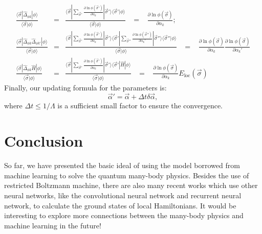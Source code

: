 \documentclass[letterpaper, 10pt]{article}
\newcommand{\qbar}{\rangle}
\newcommand{\qket}{\langle}
\begin{document}
\begin{eqnarray*}
\frac{\qket \vec{\sigma} | \hat{\Delta}_{\phi k} |\phi\qbar}{\qket\vec{\sigma}|\phi\qbar} & = & \frac{\qket \vec{\sigma} | \sum_{\vec{\sigma}'} \frac{\partial \ln \phi(\vec{\sigma}')}{\partial \alpha_k} |\vec{\sigma}'\qbar\qket\vec{\sigma}'|\phi\qbar}{\qket \vec{\sigma} | \phi \qbar} \,\,\,\,\,=\,\,\,\,\, \frac{\partial \ln \phi(\vec{\sigma})}{\partial \alpha_k};\\
\frac{\qket \vec{\sigma} | \hat{\Delta}_{\phi k} \hat{\Delta}_{\phi k'} |\phi\qbar}{\qket\vec{\sigma}|\phi\qbar} & = & \frac{\qket \vec{\sigma} | \sum_{\vec{\sigma}'} \frac{\partial \ln \phi(\vec{\sigma}')}{\partial \alpha_k} |\vec{\sigma}'\qbar\qket\vec{\sigma}'| \sum_{\vec{\sigma}''} \frac{\partial \ln \phi(\vec{\sigma}'')}{\partial \alpha_k'} |\vec{\sigma}''\qbar\qket\vec{\sigma}''| \phi\qbar}{\qket \vec{\sigma} | \phi \qbar} \,\,\,\,\,=\,\,\,\,\, \frac{\partial \ln \phi(\vec{\sigma})}{\partial \alpha_k} \frac{\partial \ln \phi(\vec{\sigma})}{\partial \alpha_k'}\\
\frac{\qket \vec{\sigma} | \hat{\Delta}_{\phi k} \hat{H} |\phi\qbar}{\qket\vec{\sigma}|\phi\qbar} & = & \frac{\qket \vec{\sigma} | \sum_{\vec{\sigma}'} \frac{\partial \ln \phi(\vec{\sigma}')}{\partial \alpha_k} |\vec{\sigma}'\qbar\qket\vec{\sigma}'| \hat{H}| \phi\qbar}{\qket \vec{\sigma} | \phi \qbar} \,\,\,\,\,=\,\,\,\,\, \frac{\partial \ln \phi(\vec{\sigma})}{\partial \alpha_k} E_{\text{loc}}(\vec{\sigma})
\end{eqnarray*}
Finally, our updating formula for the parameters is:
\[ \vec{\alpha}' = \vec{\alpha} + \Delta t \delta \vec{\alpha}, \]
where $\Delta t \leq 1/\Lambda$ is a sufficient small factor to ensure the convergence.

\section[Conclusion]{Conclusion}
So far, we have presented the basic ideal of using the model borrowed from machine learning to solve the quantum many-body physics. Besides the use of restricted Boltzmann machine, there are also many recent works which use other neural networks, like the convolutional neural network\cite{Titus2019prb} and recurrent neural network\cite{Mohamed2020prr,Roth2020arx}, to calculate the ground states of local Hamiltonians. It would be interesting to explore more connections between the many-body physics and machine learning in the future! 
\end{document}
